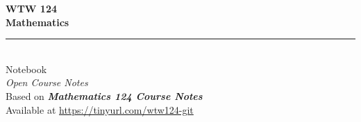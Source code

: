 \begin{titlepage}

    \vspace*{4cm}

    \begin{center}
        {\Huge \bfseries WTW 124}\\[0.5cm]
        {\Huge \bfseries Mathematics}\\[1.5cm]
        
        \rule{\textwidth}{0.4pt}\\[1.5cm]

        {\Large Notebook}\\[0.5cm]
        {\normalsize \textit{Open Course Notes}}\\[1.5cm]
        {\normalsize Based on \textit{\textbf{Mathematics 124 Course Notes}}}\\[3cm]

        {\footnotesize Available at \url{https://tinyurl.com/wtw124-git}}
    \end{center}
\end{titlepage}

\tableofcontents
\newpage
